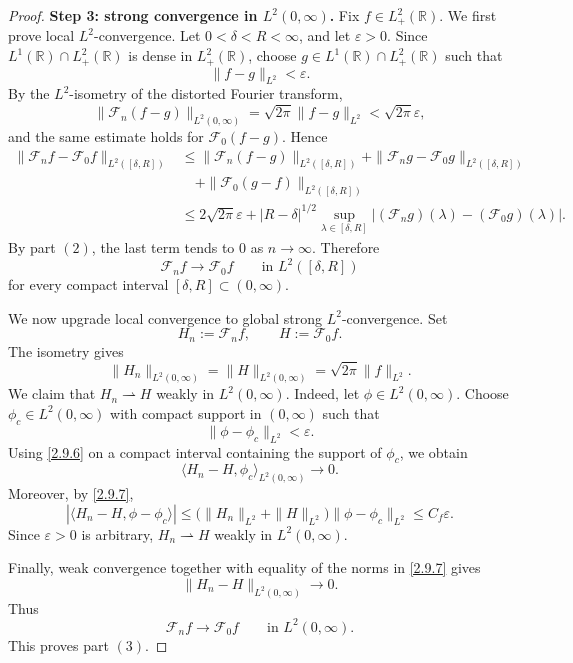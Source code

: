 \documentclass[10pt]{article}
\numberwithin{equation}{section}
\numberwithin{theorem}{section}
\begin{document}
\begin{proof}
\medskip
\noindent\textbf{Step 3: strong convergence in \(L^2(0,\infty)\).}
Fix \(f\in L^2_+(\mathbb R)\). We first prove local \(L^2\)-convergence. Let
\(0<\delta<R<\infty\), and let \(\varepsilon>0\). Since
\(L^1(\mathbb R)\cap L^2_+(\mathbb R)\) is dense in \(L^2_+(\mathbb R)\), choose
\(g\in L^1(\mathbb R)\cap L^2_+(\mathbb R)\) such that
\[
\|f-g\|_{L^2}<\varepsilon.
\]
By the \(L^2\)-isometry of the distorted Fourier transform,
\[
\|\mathcal F_n(f-g)\|_{L^2(0,\infty)}
=
\sqrt{2\pi}\|f-g\|_{L^2}
<\sqrt{2\pi}\varepsilon,
\]
and the same estimate holds for \(\mathcal F_0(f-g)\). Hence
\[
\begin{aligned}
\|\mathcal F_nf-\mathcal F_0f\|_{L^2([\delta,R])}
&\le
\|\mathcal F_n(f-g)\|_{L^2([\delta,R])}
+
\|\mathcal F_ng-\mathcal F_0g\|_{L^2([\delta,R])}  \\
&\quad
+\|\mathcal F_0(g-f)\|_{L^2([\delta,R])}  \\
&\le
2\sqrt{2\pi}\varepsilon
+
|R-\delta|^{1/2}
\sup_{\lambda\in[\delta,R]}
|(\mathcal F_ng)(\lambda)-(\mathcal F_0g)(\lambda)|.
\end{aligned}
\]
By part \((2)\), the last term tends to \(0\) as \(n\to\infty\). Therefore
\begin{equation}
\label{2.9.6}
\mathcal F_nf\to\mathcal F_0f
\qquad\text{in }L^2([\delta,R])
\end{equation}
for every compact interval \([\delta,R]\subset(0,\infty)\).

We now upgrade local convergence to global strong \(L^2\)-convergence. Set
\[
H_n:=\mathcal F_nf,
\qquad
H:=\mathcal F_0f.
\]
The isometry gives
\begin{equation}
\label{2.9.7}
\|H_n\|_{L^2(0,\infty)}
=
\|H\|_{L^2(0,\infty)}
=
\sqrt{2\pi}\|f\|_{L^2}.
\end{equation}
We claim that \(H_n\rightharpoonup H\) weakly in \(L^2(0,\infty)\). Indeed, let
\(\phi\in L^2(0,\infty)\). Choose \(\phi_c\in L^2(0,\infty)\) with compact support in
\((0,\infty)\) such that
\[
\|\phi-\phi_c\|_{L^2}<\varepsilon.
\]
Using \eqref{2.9.6} on a compact interval containing the support of \(\phi_c\), we obtain
\[
\langle H_n-H,\phi_c\rangle_{L^2(0,\infty)}\to0.
\]
Moreover, by \eqref{2.9.7},
\[
|\langle H_n-H,\phi-\phi_c\rangle|
\le
\bigl(\|H_n\|_{L^2}+\|H\|_{L^2}\bigr)\|\phi-\phi_c\|_{L^2}
\le C_f\varepsilon.
\]
Since \(\varepsilon>0\) is arbitrary, \(H_n\rightharpoonup H\) weakly in
\(L^2(0,\infty)\).

Finally, weak convergence together with equality of the norms in \eqref{2.9.7} gives
\[
\|H_n-H\|_{L^2(0,\infty)}\to0.
\]
Thus
\[
\mathcal F_nf\to \mathcal F_0f
\qquad\text{in }L^2(0,\infty).
\]
This proves part \((3)\).


\end{proof}
\end{document}
